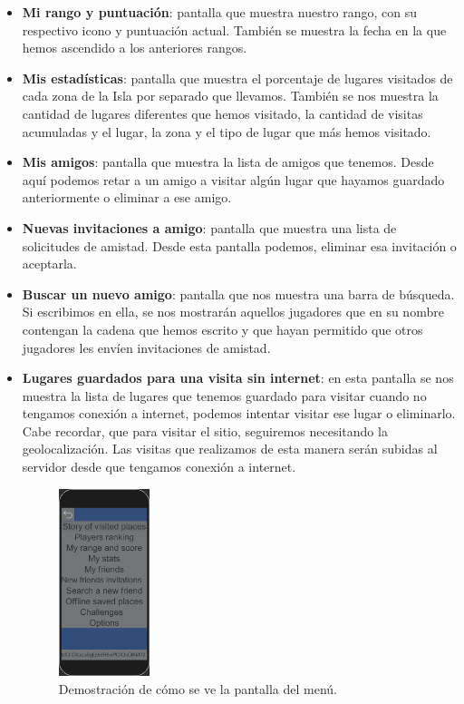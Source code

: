 \begin{itemize}
\begin{itemize}
    \item \textbf{Mi rango y puntuación}: pantalla que muestra nuestro rango, con su respectivo icono y puntuación actual. También se muestra la fecha en la que hemos ascendido a los anteriores rangos.
    
    \item \textbf{Mis estadísticas}: pantalla que muestra el porcentaje de lugares visitados de cada zona de la Isla por separado que llevamos. También se nos muestra la cantidad de lugares diferentes que hemos visitado, la cantidad de visitas acumuladas y el lugar, la zona y el tipo de lugar que más hemos visitado.
    
    \item \textbf{Mis amigos}: pantalla que muestra la lista de amigos que tenemos. Desde aquí podemos retar a un amigo a visitar algún lugar que hayamos guardado anteriormente o eliminar a ese amigo.
    
    \item \textbf{Nuevas invitaciones a amigo}: pantalla que muestra una lista de solicitudes de amistad. Desde esta pantalla podemos, eliminar esa invitación o aceptarla.
    
    \item \textbf{Buscar un nuevo amigo}: pantalla que nos muestra una barra de búsqueda. Si escribimos en ella, se nos mostrarán aquellos jugadores que en su nombre contengan la cadena que hemos escrito y que hayan permitido que otros jugadores les envíen invitaciones de amistad.
    
    \item \textbf{Lugares guardados para una visita sin internet}: en esta pantalla se nos muestra la lista de lugares que tenemos guardado para visitar cuando no tengamos conexión a internet, podemos intentar visitar ese lugar o eliminarlo. Cabe recordar, que para visitar el sitio, seguiremos necesitando la geolocalización. Las visitas que realizamos de esta manera serán subidas al servidor desde que tengamos conexión a internet.
    
    \begin{figure}[H]
    \centering
    \includegraphics[width=0.25\textwidth]{Memoria_TFG_LaTeX/images/pantallaMenu.PNG}
    \caption{Demostración de cómo se ve la pantalla del menú.}
    \label{fig:pantallaMenu}
    \end{figure}
    

\end{itemize}
\end{itemize}
